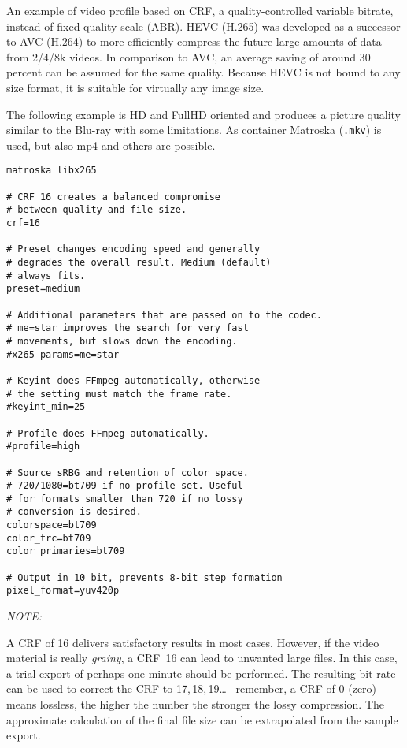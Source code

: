An example of video profile based on CRF, a quality-controlled
variable bitrate, instead of fixed quality scale (ABR).  HEVC
(H.265) was developed as a successor to AVC (H.264) to more
efficiently compress the future large amounts of data from 2/4/8k
videos.  In comparison to AVC, an average saving of around 30
percent can be assumed for the same quality.  Because HEVC is not
bound to any size format, it is suitable for virtually any image
size.

The following example is HD and FullHD oriented and produces a
picture quality similar to the Blu-ray with some limitations.  As
container Matroska (\texttt{.mkv}) is used, but also mp4 and others
are possible.

\begin{lstlisting}[style=sh]
matroska libx265

# CRF 16 creates a balanced compromise
# between quality and file size.
crf=16

# Preset changes encoding speed and generally
# degrades the overall result. Medium (default)
# always fits.
preset=medium

# Additional parameters that are passed on to the codec.
# me=star improves the search for very fast
# movements, but slows down the encoding.
#x265-params=me=star

# Keyint does FFmpeg automatically, otherwise
# the setting must match the frame rate.
#keyint_min=25

# Profile does FFmpeg automatically.
#profile=high

# Source sRBG and retention of color space.
# 720/1080=bt709 if no profile set. Useful
# for formats smaller than 720 if no lossy
# conversion is desired.
colorspace=bt709
color_trc=bt709
color_primaries=bt709

# Output in 10 bit, prevents 8-bit step formation
pixel_format=yuv420p
\end{lstlisting}

\noindent \textit{NOTE:}

A CRF of 16 delivers satisfactory results in most cases. However, if
the video material is really \emph{grainy}, a CRF~16 can lead to
unwanted large files.  In this case, a trial export of perhaps one
minute should be performed. The resulting bit rate can be used to
correct the CRF to 17,\,18,\,19\ldots -- remember, a CRF of $0$ (zero)
means lossless, the higher the number the stronger the lossy
compression. The approximate calculation of the final file size can
be extrapolated from the sample export.

